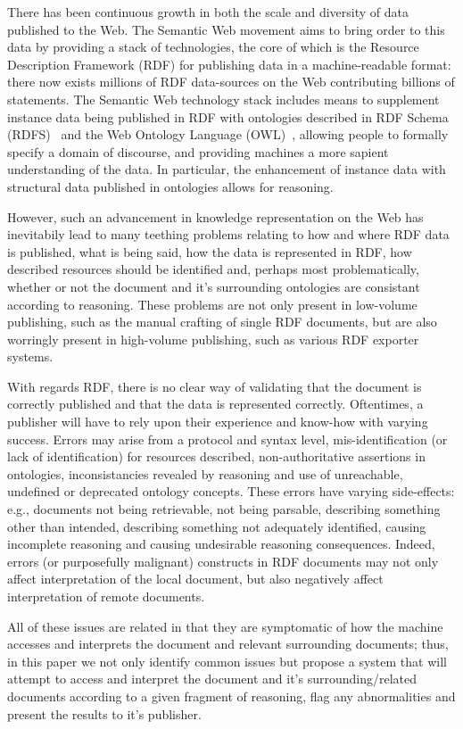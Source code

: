 \documentclass{llncs}
\begin{document}
There has been continuous growth in both the scale and diversity of data published to the Web.
The Semantic Web movement aims to bring order to this data by providing a stack of technologies, the core of which is the Resource Description Framework (RDF) for publishing data in a machine-readable format: there now exists millions of RDF data-sources on the Web contributing billions of statements.
The Semantic Web technology stack includes means to supplement instance data being published in RDF with ontologies described in RDF Schema (RDFS)~\cite{key:rdfschema} and the Web Ontology Language (OWL)~\cite{key:owl}, allowing people to formally specify a domain of discourse, and providing machines a more sapient understanding of the data.
In particular, the enhancement of instance data with structural data published in ontologies allows for reasoning.

However, such an advancement in knowledge representation on the Web has inevitabily lead to many teething problems relating to how and where RDF data is published, what is being said, how the data is represented in RDF, how described resources should be identified and, perhaps most problematically, whether or not the document and it's surrounding ontologies are consistant according to reasoning.
These problems are not only present in low-volume publishing, such as the manual crafting of single RDF documents, but are also worringly present in high-volume publishing, such as various RDF exporter systems.

With regards RDF, there is no clear way of validating that the document is correctly published and that the data is represented correctly.
Oftentimes, a publisher will have to rely upon their experience and know-how with varying success.
Errors may arise from a protocol and syntax level, mis-identification (or lack of identification) for resources described, non-authoritative assertions in ontologies, inconsistancies revealed by reasoning and use of unreachable, undefined or deprecated ontology concepts.
These errors have varying side-effects: e.g., documents not being retrievable, not being parsable, describing something other than intended, describing something not adequately identified, causing incomplete reasoning and causing undesirable reasoning consequences.
Indeed, errors (or purposefully malignant) constructs in RDF documents may not only affect interpretation of the local document, but also negatively affect interpretation of remote documents.

All of these issues are related in that they are symptomatic of how the machine accesses and interprets the document and relevant surrounding documents; thus, in this paper we not only identify common issues but propose a system that will attempt to access and interpret the document and it's surrounding/related documents according to a given fragment of reasoning, flag any abnormalities and present the results to it's publisher.
\end{document}
